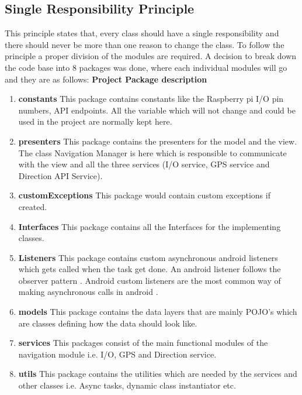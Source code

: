 \subsection{Single Responsibility Principle}
    
    This principle states that, every class should have a single responsibility
    and there should never be more than one reason to change the class. To
    follow the principle a proper division of the modules are required. 
    A decision to break down the code base into 8 packages was done, where each 
    individual modules will go and they are as follows:
    \newpage
    \textbf{Project Package description}
    \begin{enumerate}
        \item 
            \textbf{constants} 
                This package contains constants like the Raspberry pi I/O pin 
                numbers, API endpoints. All the variable which will not 
                change and could be used in the project are normally kept here.
        \item 
            \textbf{presenters} 
                This package contains the presenters for the model and the view.
                The class Navigation Manager is here which is responsible to communicate
                with the view and all the three services (I/O service, GPS service and 
                Direction API Service).  
        \item 
            \textbf{customExceptions}
                This package would contain custom exceptions if created.
        \item 
            \textbf{Interfaces}
                This package contains all the Interfaces for the implementing classes. 
        \item 
            \textbf{Listeners}
                This package contains custom asynchronous android listeners which gets 
                called when the task get done. An android listener follows the
                observer pattern \cite{Hotop2015}. Android custom listeners 
                are the most common way of
                making asynchronous calls in android \cite{Codepath}. 
        \item 
            \textbf{models}
            This package contains the data layers that are mainly 
            POJO's \cite{Pivotal} which are classes defining how the
            data should look like.
        \item 
            \textbf{services} 
                This packages consist of the main functional modules
                of the navigation module                
                i.e. I/O, GPS and Direction service. 
        \item 
            \textbf{utils}
                This package contains the utilities which are needed by the 
                services and other classes
                i.e. Async tasks, dynamic class instantiator etc. 
    \end{enumerate}

